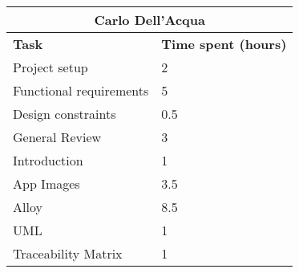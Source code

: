 \begin{table}[H]
  \centering
  \begin{tabular}{l|l}
    \multicolumn{2}{c}{\textbf{Carlo Dell'Acqua}} \\
    \hline
    \textbf{Task} & \textbf{Time spent (hours)}\\
    \hline
    Project setup & 2 \\
    Functional requirements & 5 \\
    Design constraints & 0.5 \\
    General Review & 3 \\
    Introduction & 1 \\
    App Images & 3.5 \\
    Alloy & 8.5 \\
    UML & 1 \\
    Traceability Matrix & 1 \\
  \end{tabular}
\end{table}